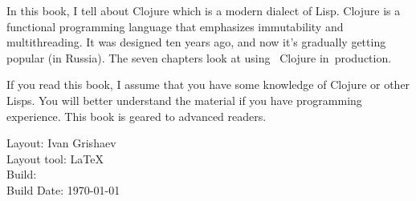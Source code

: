 \thispagestyle{empty}

In this book, I tell about Clojure which is a modern dialect of Lisp. 
Clojure is a functional programming  language that emphasizes immutability and multithreading. 
It was designed ten years ago, and now it's gradually getting popular (in Russia).  
The seven chapters look at using ~Clojure in~production.


If you read this book, I assume that you have some knowledge of Clojure or other Lisps. 
You will better understand the material if you have programming experience. This book is geared to advanced readers.

\vspace{5em}

\noindent
Layout: Ivan Grishaev\\
Layout tool: \LaTeX\\
Build: \commithash\xspace \committs\\
Build Date: \today
